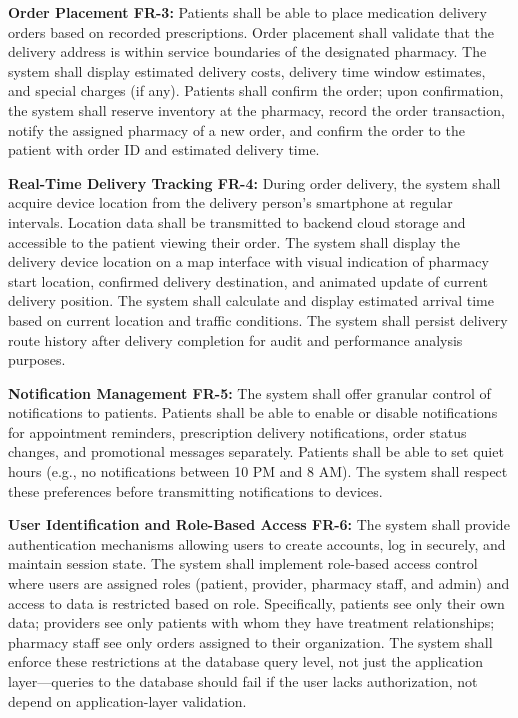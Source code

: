\documentclass[12pt,a4paper]{report}
\begin{document}
\textbf{Order Placement FR-3:} Patients shall be able to place medication delivery orders based on recorded prescriptions. Order placement shall validate that the delivery address is within service boundaries of the designated pharmacy. The system shall display estimated delivery costs, delivery time window estimates, and special charges (if any). Patients shall confirm the order; upon confirmation, the system shall reserve inventory at the pharmacy, record the order transaction, notify the assigned pharmacy of a new order, and confirm the order to the patient with order ID and estimated delivery time.

\textbf{Real-Time Delivery Tracking FR-4:} During order delivery, the system shall acquire device location from the delivery person's smartphone at regular intervals. Location data shall be transmitted to backend cloud storage and accessible to the patient viewing their order. The system shall display the delivery device location on a map interface with visual indication of pharmacy start location, confirmed delivery destination, and animated update of current delivery position. The system shall calculate and display estimated arrival time based on current location and traffic conditions. The system shall persist delivery route history after delivery completion for audit and performance analysis purposes.

\textbf{Notification Management FR-5:} The system shall offer granular control of notifications to patients. Patients shall be able to enable or disable notifications for appointment reminders, prescription delivery notifications, order status changes, and promotional messages separately. Patients shall be able to set quiet hours (e.g., no notifications between 10 PM and 8 AM). The system shall respect these preferences before transmitting notifications to devices.

\textbf{User Identification and Role-Based Access FR-6:} The system shall provide authentication mechanisms allowing users to create accounts, log in securely, and maintain session state. The system shall implement role-based access control where users are assigned roles (patient, provider, pharmacy staff, and admin) and access to data is restricted based on role. Specifically, patients see only their own data; providers see only patients with whom they have treatment relationships; pharmacy staff see only orders assigned to their organization. The system shall enforce these restrictions at the database query level, not just the application layer—queries to the database should fail if the user lacks authorization, not depend on application-layer validation.
\end{document}
